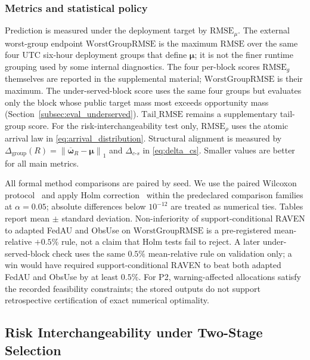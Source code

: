 \documentclass[letterpaper,journal]{IEEEtran}
\begin{document}
\subsubsection{Metrics and statistical policy}

Prediction is measured under the deployment target by
$\mathrm{RMSE}_{\mu}$.  The external worst-group endpoint
$\mathrm{WorstGroupRMSE}$ is the maximum $\mathrm{RMSE}$ over the same
four UTC six-hour deployment groups that define $\boldsymbol\mu$; it is
not the finer runtime grouping used by some internal diagnostics.
The four per-block scores $\mathrm{RMSE}_g$ themselves are reported in
the supplemental material; $\mathrm{WorstGroupRMSE}$ is their maximum.
The under-served-block score uses the same four groups but evaluates
only the block whose public target mass most exceeds opportunity mass
(Section~\ref{subsec:eval_underserved}).
$\mathrm{Tail\_RMSE}$ remains a supplementary tail-group score.
For the risk-interchangeability test only, $\mathrm{RMSE}_{\rho}$ uses
the atomic arrival law in \eqref{eq:arrival_distribution}.  Structural
alignment is measured by
$\Delta_{\mathrm{group}}(R)=\left\|\overline{\boldsymbol\omega}_R-\boldsymbol\mu\right\|_1$
and $\Delta_{c\text{-}s}$ in \eqref{eq:delta_cs}.  Smaller values are
better for all main metrics.

All formal method comparisons are paired by seed.  We use the paired
Wilcoxon protocol~\cite{wilcoxon1945individual} and apply Holm
correction~\cite{holm1979simple} within the predeclared comparison
families at $\alpha=0.05$; absolute differences below
$10^{-12}$ are treated as numerical ties.  Tables report
mean $\pm$ standard deviation.  Non-inferiority of support-conditional RAVEN to
adapted FedAU and ObsUse on $\mathrm{WorstGroupRMSE}$ is a
pre-registered mean-relative $+0.5\%$ rule, not a claim that Holm
tests fail to reject.  A later under-served-block check uses the same
$0.5\%$ mean-relative rule on validation only; a win would have required
support-conditional RAVEN to beat both adapted FedAU and ObsUse by at least $0.5\%$.
For P2, warning-affected allocations satisfy
the recorded feasibility constraints; the stored outputs do not
support retrospective certification of exact numerical optimality.

\subsection{Risk Interchangeability under Two-Stage Selection}
\label{subsec:eval_rq1}
\end{document}
